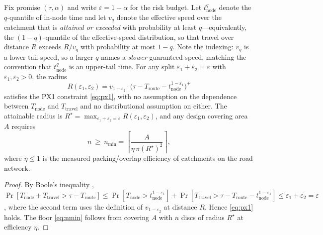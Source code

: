 \begin{proposition}\label{prop:radius}
Fix promise $(\tau,\alpha)$ and write $\varepsilon=1-\alpha$ for the risk budget. Let $t^{q}_{\mathrm{node}}$ denote the $q$-quantile of in-node time and let $v_{q}$ denote the effective speed over the catchment that is \emph{attained or exceeded} with probability at least $q$---equivalently, the $(1-q)$-quantile of the effective-speed distribution, so that travel over distance $R$ exceeds $R/v_q$ with probability at most $1-q$. Note the indexing: $v_q$ is a lower-tail speed, so a larger $q$ names a \emph{slower} guaranteed speed, matching the convention that $t^{q}_{\mathrm{node}}$ is an upper-tail time. For any split $\varepsilon_1+\varepsilon_2=\varepsilon$ with $\varepsilon_1,\varepsilon_2>0$, the radius
\begin{equation}\label{eq:radius}
R(\varepsilon_1,\varepsilon_2)=v_{1-\varepsilon_2}\cdot\bigl(\tau-T_{\mathrm{route}}-t^{1-\varepsilon_1}_{\mathrm{node}}\bigr)^{+}
\end{equation}
satisfies the PX1 constraint \eqref{eq:px1}, with no assumption on the dependence between $T_{\mathrm{node}}$ and $T_{\mathrm{travel}}$ and no distributional assumption on either. The attainable radius is $R^\star=\max_{\varepsilon_1+\varepsilon_2=\varepsilon}R(\varepsilon_1,\varepsilon_2)$, and any design covering area $A$ requires
\begin{equation}\label{eq:nmin}
n\ \ge\ n_{\min}=\left\lceil \frac{A}{\eta\,\pi (R^\star)^2}\right\rceil,
\end{equation}
where $\eta\le1$ is the measured packing/overlap efficiency of catchments on the road network.
\end{proposition}
\begin{proof}
By Boole's inequality \cite{feller1968}, $\Pr[T_{\mathrm{node}}+T_{\mathrm{travel}}>\tau-T_{\mathrm{route}}]\le\Pr[T_{\mathrm{node}}>t^{1-\varepsilon_1}_{\mathrm{node}}]+\Pr[T_{\mathrm{travel}}>\tau-T_{\mathrm{route}}-t^{1-\varepsilon_1}_{\mathrm{node}}]\le\varepsilon_1+\varepsilon_2=\varepsilon$, where the second term uses the definition of $v_{1-\varepsilon_2}$ at distance $R$. Hence \eqref{eq:px1} holds. The floor \eqref{eq:nmin} follows from covering $A$ with $n$ discs of radius $R^\star$ at efficiency $\eta$.
\end{proof}


